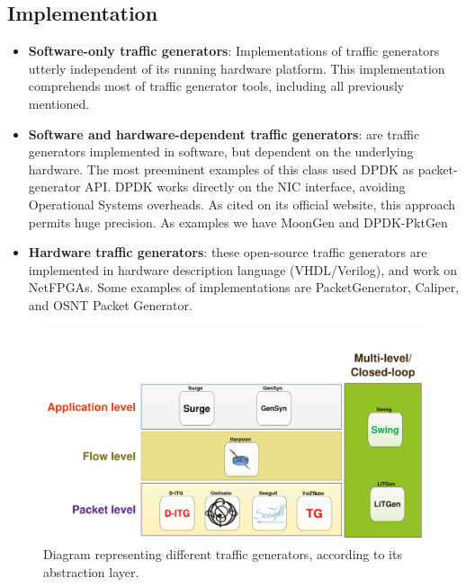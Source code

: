 \subsection{Implementation}

\begin{itemize}

\item \textbf{Software-only traffic generators}: Implementations of traffic generators utterly independent of its running hardware platform. This implementation comprehends most of traffic generator tools, including all previously mentioned. 

\item \textbf{Software and hardware-dependent traffic generators}: are traffic generators implemented in software, but dependent on the underlying hardware. The most preeminent examples of this class used DPDK\cite{web-dpdk} as packet-generator API. DPDK works directly on the \acrshort{NIC} interface, avoiding Operational Systems overheads. As cited on its official website, this approach permits huge precision. As examples we have MoonGen\cite{moongen-paper} and DPDK-PktGen\cite{web-dpdk-pktgen}

\item \textbf{Hardware traffic generators}: these open-source traffic generators are implemented in hardware description language (VHDL/Verilog), and work on \acrshort{NetFPGA}s. Some examples of implementations are PacketGenerator\cite{pktgen-netfpga-paper}, Caliper\cite{caliper-paper}, and OSNT Packet Generator\cite{osnt-paper}.

\end{itemize}


\begin{figure}[!ht]
    \centering
    \includegraphics[scale=0.4]{figures/ch2/types-workload-tools}
    \caption{Diagram representing different traffic generators, according to its abstraction layer.}
    \label{fig:layers-workload-tools}
\end{figure}





